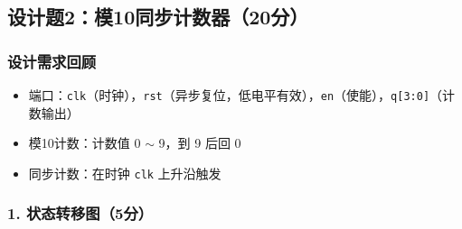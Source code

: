 \subsection{设计题2：模10同步计数器（20分）}

\subsubsection*{设计需求回顾}
\begin{itemize}
    \item 端口：\texttt{clk}（时钟），\texttt{rst}（异步复位，低电平有效），\texttt{en}（使能），\texttt{q[3:0]}（计数输出）
    \item 模10计数：计数值 0 $\sim$ 9，到 9 后回 0
    \item 同步计数：在时钟 \texttt{clk} 上升沿触发
\end{itemize}

\subsubsection*{1. 状态转移图（5分）}

